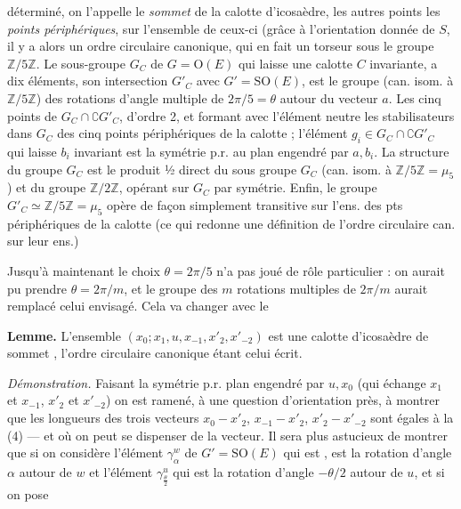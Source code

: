 \documentclass[11pt,a4paper]{article}
\begin{document}
déterminé,  on l'appelle le \emph{sommet} de la calotte d'icosaèdre, les autres points les \emph{points périphériques},  sur l'ensemble de ceux-ci (grâce à l'orientation donnée de $S$,  il y a alors un ordre circulaire canonique, qui en fait un torseur sous le groupe $\mathbb{Z}/5\mathbb{Z}$. Le sous-groupe $G_C$ de $G = \mathrm{O}(E)$ qui laisse une calotte $C$ invariante, \struck{\ill{}} a dix éléments,  son intersection $G'_C$ avec $G' = \mathrm{SO}(E)$, est le groupe (can. isom. à $\mathbb{Z}/5\mathbb{Z}$) des rotations d'angle multiple de $2\pi/5 = \theta$ autour du \struck{\ill{}} vecteur $a$.  Les cinq points de $G_C \cap \complement G'_C$, d'ordre 2, et formant avec l'élément neutre  les stabilisateurs dans $G_C$ des cinq points périphériques de la calotte ; l'élément $g_i \in G_C \cap \complement G'_C$ qui laisse $b_i$ invariant est la symétrie p.r. au plan engendré par $a, b_i$. La structure du groupe $G_C$ est le produit ½ direct du \struck{\ill{}} sous groupe $G_C$ (can. isom. à $\mathbb{Z}/5\mathbb{Z} = \mu_5$) et du groupe $\mathbb{Z}/2\mathbb{Z}$, opérant sur $G_C$ par symétrie. Enfin, le groupe $G'_C \simeq \mathbb{Z}/5\mathbb{Z} = \mu_5$ opère de façon simplement transitive sur l'ens. des pts périphériques de la calotte (ce qui redonne une définition de l'ordre circulaire can. sur leur ens.)

Jusqu'à maintenant le choix $\theta = 2\pi/5$ n'a pas joué de rôle particulier : on aurait pu prendre $\theta = 2\pi/m$, et le groupe des $m$ rotations multiples de $2\pi/m$ aurait remplacé celui envisagé. Cela va changer avec le

\textbf{Lemme.} L'ensemble $(x_0; x_1, u, x_{-1}, x'_2, x'_{-2})$ est une calotte d'icosaèdre de sommet , l'ordre circulaire canonique étant celui écrit.

\emph{Démonstration.} Faisant la symétrie p.r.  plan  engendré par $u, x_0$ (qui échange $x_1$ et $x_{-1}$, $x'_2$ et $x'_{-2}$) on est ramené, à une question d'orientation près, à montrer que les  longueurs des trois vecteurs $x_0 - x'_2$, $x_{-1} - x'_2$, $x'_2 - x'_{-2}$ sont égales à la (4) --- et où on peut se dispenser de la  vecteur.
\struck{\ill{}} Il sera plus astucieux de montrer que si \struck{\ill{}} on considère l'élément $\gamma^{w}_{\alpha}$ de $G' = \mathrm{SO}(E)$ qui est ,  est la rotation d'angle $\alpha$ autour de $w$ et l'élément $\gamma^{u}_{\frac{\theta}{2}}$ qui est la  rotation d'angle $-\theta/2$ autour de $u$, et si on pose
\end{document}
